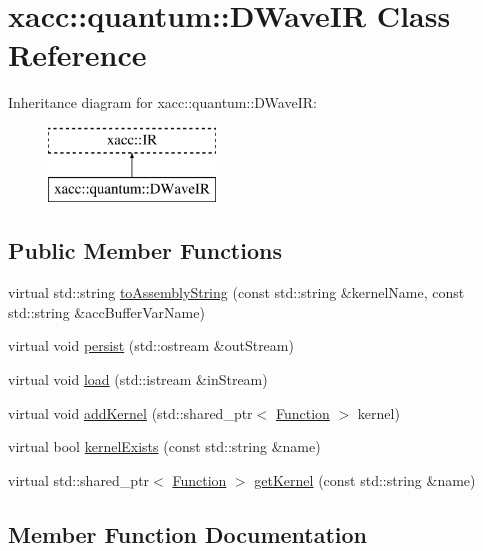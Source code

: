 \hypertarget{a00081}{}\section{xacc\+:\+:quantum\+:\+:D\+Wave\+IR Class Reference}
\label{a00081}
Inheritance diagram for xacc\+:\+:quantum\+:\+:D\+Wave\+IR\+:\begin{figure}[H]
\begin{center}
\leavevmode
\includegraphics[height=2.000000cm]{a00081}
\end{center}
\end{figure}
\subsection*{Public Member Functions}
\begin{DoxyCompactItemize}
\item 
virtual std\+::string \hyperlink{a00081_ac19ad098d5bbfe769809c10e26ebebc6}{to\+Assembly\+String} (const std\+::string \&kernel\+Name, const std\+::string \&acc\+Buffer\+Var\+Name)
\item 
virtual void \hyperlink{a00081_adac268c6fa2234902efeb9b3c07c0ac2}{persist} (std\+::ostream \&out\+Stream)
\item 
virtual void \hyperlink{a00081_a94d814172ec30c7ed32e6ab52bc2a41a}{load} (std\+::istream \&in\+Stream)
\item 
virtual void \hyperlink{a00081_a7e1ddff2771233dc45f60a6b7e15ef63}{add\+Kernel} (std\+::shared\+\_\+ptr$<$ \hyperlink{a00106}{Function} $>$ kernel)
\item 
virtual bool \hyperlink{a00081_ace9b8c6f4f29e32c8482fec4eacb637a}{kernel\+Exists} (const std\+::string \&name)
\item 
virtual std\+::shared\+\_\+ptr$<$ \hyperlink{a00106}{Function} $>$ \hyperlink{a00081_ac4295dfef98c94d7154a4fd39a6e5d1c}{get\+Kernel} (const std\+::string \&name)
\end{DoxyCompactItemize}


\subsection{Member Function Documentation}
